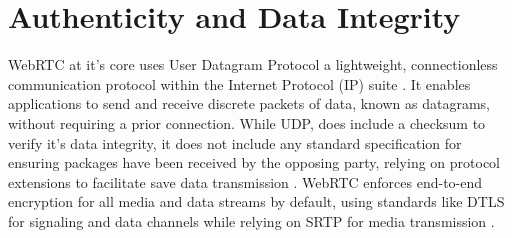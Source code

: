 \documentclass[conference]{IEEEtran}
\begin{document}
\section{Authenticity and Data Integrity}
WebRTC at it's core uses User Datagram Protocol a lightweight, connectionless communication protocol 
within the Internet Protocol (IP) suite \cite{RFC768}. It enables applications to send and receive 
discrete packets of data, known as datagrams, without requiring a prior connection. While UDP, does
include a checksum to verify it's data integrity, it does not include any standard specification for ensuring
packages have been received by the opposing party, relying on protocol extensions to facilitate save
data transmission \cite{RFC768}. 
WebRTC enforces end-to-end encryption for all media and data streams by default, using 
standards like DTLS for signaling and data channels while relying on SRTP for media transmission \cite{RFC8826}. 
\end{document}
